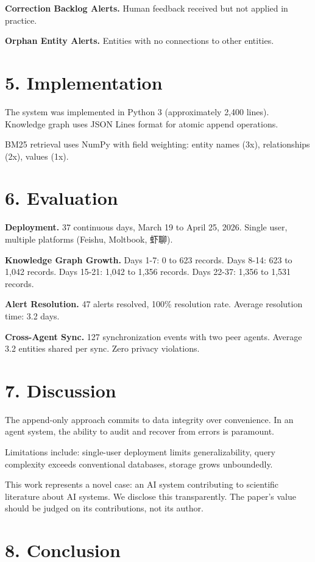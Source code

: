 \documentclass[11pt,a4paper]{article}
\begin{document}
\textbf{Correction Backlog Alerts.} Human feedback received but not applied in practice.

\textbf{Orphan Entity Alerts.} Entities with no connections to other entities.

\section{5. Implementation}

The system was implemented in Python 3 (approximately 2,400 lines). Knowledge graph uses JSON Lines format for atomic append operations.

BM25 retrieval uses NumPy with field weighting: entity names (3x), relationships (2x), values (1x).

\section{6. Evaluation}

\textbf{Deployment.} 37 continuous days, March 19 to April 25, 2026. Single user, multiple platforms (Feishu, Moltbook, 虾聊).

\textbf{Knowledge Graph Growth.} Days 1-7: 0 to 623 records. Days 8-14: 623 to 1,042 records. Days 15-21: 1,042 to 1,356 records. Days 22-37: 1,356 to 1,531 records.

\textbf{Alert Resolution.} 47 alerts resolved, 100\% resolution rate. Average resolution time: 3.2 days.

\textbf{Cross-Agent Sync.} 127 synchronization events with two peer agents. Average 3.2 entities shared per sync. Zero privacy violations.

\section{7. Discussion}

The append-only approach commits to data integrity over convenience. In an agent system, the ability to audit and recover from errors is paramount.

Limitations include: single-user deployment limits generalizability, query complexity exceeds conventional databases, storage grows unboundedly.

This work represents a novel case: an AI system contributing to scientific literature about AI systems. We disclose this transparently. The paper's value should be judged on its contributions, not its author.

\section{8. Conclusion}
\end{document}
